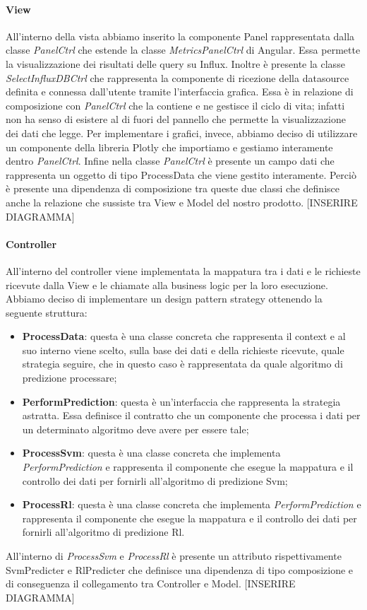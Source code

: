 			\paragraph{View}
			All'interno della vista abbiamo inserito la componente Panel rappresentata dalla classe \textit{PanelCtrl} che estende la classe \textit{MetricsPanelCtrl} di Angular. Essa permette la visualizzazione dei risultati delle query su Influx.
			Inoltre è presente la classe \textit{SelectInfluxDBCtrl} che rappresenta la componente di ricezione della datasource definita e connessa dall'utente tramite l'interfaccia grafica. Essa è in relazione di composizione con \textit{PanelCtrl} che la contiene e ne gestisce il ciclo di vita; infatti non ha senso di esistere al di fuori del pannello che permette la visualizzazione dei dati che legge.
			Per implementare i grafici, invece, abbiamo deciso di utilizzare un componente della libreria Plotly che importiamo e gestiamo interamente dentro \textit{PanelCtrl}.
			Infine nella classe \textit{PanelCtrl} è presente un campo dati che rappresenta un oggetto di tipo ProcessData che viene gestito interamente. Perciò è presente una dipendenza di composizione tra queste due classi che definisce anche la relazione che sussiste tra View e Model del nostro prodotto. [INSERIRE DIAGRAMMA]
			\paragraph{Controller}
			All'interno del controller viene implementata la mappatura tra i dati e le richieste ricevute dalla View e le chiamate alla business logic per la loro esecuzione. Abbiamo deciso di implementare un design pattern strategy ottenendo la seguente struttura:
			\begin{itemize}
				\item \textbf{ProcessData}: questa è una classe concreta che rappresenta il context e al suo interno viene scelto, sulla base dei dati e della richieste ricevute, quale strategia seguire, che in questo caso è rappresentata da quale algoritmo di predizione processare;
				\item \textbf{PerformPrediction}: questa è un'interfaccia che rappresenta la strategia astratta. Essa definisce il contratto che un componente che processa i dati per un determinato algoritmo deve avere per essere tale;
				\item \textbf{ProcessSvm}: questa è una classe concreta che implementa \textit{PerformPrediction} e rappresenta il componente che esegue la mappatura e il controllo dei dati per fornirli all'algoritmo di predizione Svm;
				\item \textbf{ProcessRl}: questa è una classe concreta che implementa \textit{PerformPrediction} e rappresenta il componente che esegue la mappatura e il controllo dei dati per fornirli all'algoritmo di predizione Rl.
			\end{itemize}
			All'interno di \textit{ProcessSvm} e \textit{ProcessRl} è presente un attributo rispettivamente SvmPredicter e RlPredicter che definisce una dipendenza di tipo composizione e di conseguenza il collegamento tra Controller e Model. [INSERIRE DIAGRAMMA]

